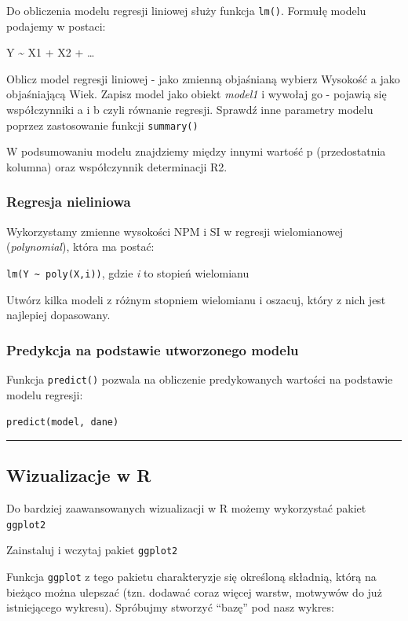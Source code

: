 \documentclass[]{article}
\begin{document}
Do obliczenia modelu regresji liniowej służy funkcja \texttt{lm()}.
Formułę modelu podajemy w postaci:

Y \textasciitilde{} X1 + X2 + \ldots{}

Oblicz model regresji liniowej - jako zmienną objaśnianą wybierz
Wysokość a jako objaśniającą Wiek. Zapisz model jako obiekt
\emph{model1} i wywołaj go - pojawią się współczynniki a i b czyli
równanie regresji. Sprawdź inne parametry modelu poprzez zastosowanie
funkcji \texttt{summary()}

W podsumowaniu modelu znajdziemy między innymi wartość p (przedostatnia
kolumna) oraz współczynnik determinacji R2.

\subsubsection{Regresja nieliniowa}\label{regresja-nieliniowa}

Wykorzystamy zmienne wysokości NPM i SI w regresji wielomianowej
(\emph{polynomial}), która ma postać:

\texttt{lm(Y\ \textasciitilde{}\ poly(X,i))}, gdzie \emph{i} to stopień
wielomianu

Utwórz kilka modeli z różnym stopniem wielomianu i oszacuj, który z nich
jest najlepiej dopasowany.

\subsubsection{Predykcja na podstawie utworzonego
modelu}\label{predykcja-na-podstawie-utworzonego-modelu}

Funkcja \texttt{predict()} pozwala na obliczenie predykowanych wartości
na podstawie modelu regresji:

\texttt{predict(model,\ dane)}

\begin{center}\rule{0.5\linewidth}{\linethickness}\end{center}

\subsection{Wizualizacje w R}\label{wizualizacje-w-r}

Do bardziej zaawansowanych wizualizacji w R możemy wykorzystać pakiet
\texttt{ggplot2}

Zainstaluj i wczytaj pakiet \texttt{ggplot2}

Funkcja \texttt{ggplot} z tego pakietu charakteryzje się określoną
składnią, którą na bieżąco można ulepszać (tzn. dodawać coraz więcej
warstw, motwywów do już istniejącego wykresu). Spróbujmy stworzyć
``bazę'' pod nasz wykres:
\end{document}
